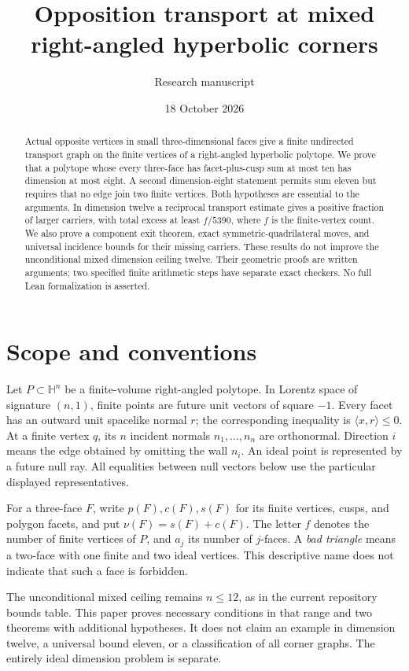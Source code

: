 \documentclass[11pt]{article}
\title{Opposition transport at mixed right-angled hyperbolic corners}
\author{Research manuscript}
\date{18 October 2026}
\theoremstyle{definition}\newtheorem{definition}[theorem]{Definition}
\theoremstyle{remark}\newtheorem{remark}[theorem]{Remark}
\newcommand{\Hh}{\mathbb H}
\newcommand{\ip}[2]{\langle #1,#2\rangle}
\newcommand{\nuu}{\nu}
\begin{document}
\maketitle
\begin{abstract}
Actual opposite vertices in small three-dimensional faces give a finite
undirected transport graph on the finite vertices of a right-angled
hyperbolic polytope. We prove that a polytope whose every three-face has
facet-plus-cusp sum at most ten has dimension at most eight. A second
dimension-eight statement permits sum eleven but requires that no edge
join two finite vertices. Both hypotheses are essential to the arguments.
In dimension twelve a reciprocal transport estimate gives a positive
fraction of larger carriers, with total excess at least \(f/5390\),
where \(f\) is the finite-vertex count.
We also prove a component exit theorem, exact symmetric-quadrilateral
moves, and universal incidence bounds for their missing carriers.
These results do not improve the unconditional mixed dimension ceiling
twelve. Their geometric proofs are written arguments; two specified
finite arithmetic steps have separate exact checkers. No full Lean
formalization is asserted.
\end{abstract}

\section{Scope and conventions}
Let \(P\subset\Hh^n\) be a finite-volume right-angled polytope. In Lorentz
space of signature \((n,1)\), finite points are future unit vectors of
square \(-1\). Every facet has an outward unit spacelike normal \(r\);
the corresponding inequality is \(\ip{x}{r}\le0\). At a finite vertex
\(q\), its \(n\) incident normals \(n_1,\ldots,n_n\) are orthonormal.
Direction \(i\) means the edge obtained by omitting the wall \(n_i\).
An ideal point is represented by a future null ray. All equalities
between null vectors below use the particular displayed representatives.

For a three-face \(F\), write \(p(F),c(F),s(F)\) for its finite vertices,
cusps, and polygon facets, and put \(\nuu(F)=s(F)+c(F)\).
The letter \(f\) denotes the number of finite vertices of \(P\), and
\(a_j\) its number of \(j\)-faces. A \emph{bad triangle} means a
two-face with one finite and two ideal vertices. This descriptive name
does not indicate that such a face is forbidden.

The unconditional mixed ceiling remains \(n\le12\), as in the current
repository bounds table. This paper proves necessary conditions in
that range and two theorems with additional hypotheses. It does not
claim an example in dimension twelve, a universal bound eleven, or a
classification of all corner graphs. The entirely ideal dimension
problem is separate.
\end{document}
